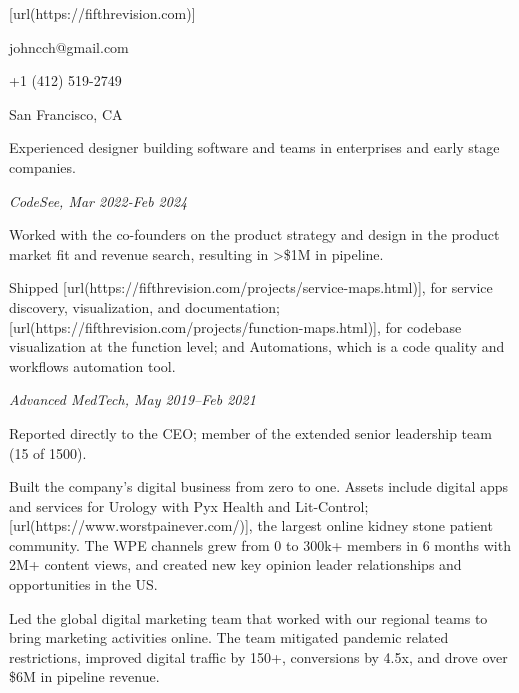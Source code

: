 \startsectionlevel[title={Chong Han Chua},reference={chong-han-chua}]

\startitemize[packed]
\item
  [url(https://fifthrevision.com)]
\item
  johncch@gmail.com
\item
  +1 (412) 519-2749
\item
  San Francisco, CA
\stopitemize

\stopsectionlevel

\startsectionlevel[title={Hello},reference={hello}]

Experienced designer building software and teams in enterprises and
early stage companies.

\stopsectionlevel

\startsectionlevel[title={Experience},reference={experience}]

\startsectionlevel[title={VP of Design},reference={vp-of-design}]

{\em CodeSee, Mar 2022-Feb 2024}

\startitemize[packed]
\item
  Worked with the co-founders on the product strategy and design in the
  product market fit and revenue search, resulting in >\$1M in pipeline.
\item
  Shipped [url(https://fifthrevision.com/projects/service-maps.html)], for
  service discovery, visualization, and documentation; [url(https://fifthrevision.com/projects/function-maps.html)], for
  codebase visualization at the function level; and Automations, which
  is a code quality and workflows automation tool.
\stopitemize

\stopsectionlevel

\startsectionlevel[title={Head of Digital
Experience},reference={head-of-digital-experience}]

{\em Advanced MedTech, May 2019--Feb 2021}

\startitemize[packed]
\item
  Reported directly to the CEO; member of the extended senior leadership
  team (15 of 1500).
\item
  Built the company's digital business from zero to one. Assets include
  digital apps and services for Urology with Pyx Health and Lit-Control;
  [url(https://www.worstpainever.com/)], the
  largest online kidney stone patient community. The WPE channels grew
  from 0 to 300k+ members in 6 months with 2M+ content views, and
  created new key opinion leader relationships and opportunities in the
  US.
\item
  Led the global digital marketing team that worked with our regional
  teams to bring marketing activities online. The team mitigated
  pandemic related restrictions, improved digital traffic by
  150+, conversions by 4.5x, and drove over \$6M in
  pipeline revenue.
\stopitemize


